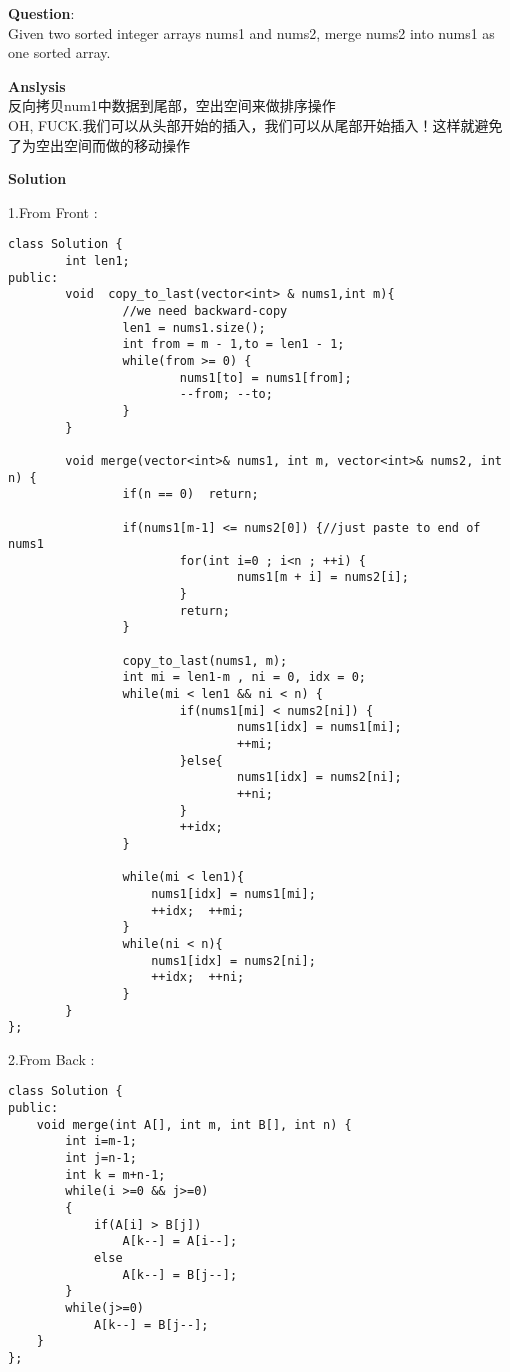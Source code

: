     
\begin{description}
    \item{\textbf{Question}}:\\%
		Given two sorted integer arrays nums1 and nums2, merge nums2 into nums1 as one sorted array.\\

    \item{\textbf{Anslysis}}\\
		反向拷贝num1中数据到尾部，空出空间来做排序操作\\
		OH, FUCK.我们可以从头部开始的插入，我们可以从尾部开始插入！这样就避免了为空出空间而做的移动操作\\

    \item{\textbf{Solution}}\\
	\item{1.From Front} : \\
		\begin{lstlisting}
class Solution {
		int len1;
public:
		void  copy_to_last(vector<int> & nums1,int m){
				//we need backward-copy
				len1 = nums1.size();
				int from = m - 1,to = len1 - 1;
				while(from >= 0) {
						nums1[to] = nums1[from];
						--from;	--to;
				}
		}

	    void merge(vector<int>& nums1, int m, vector<int>& nums2, int n) {
				if(n == 0)	return; 

				if(nums1[m-1] <= nums2[0]) {//just paste to end of nums1
						for(int i=0 ; i<n ; ++i) {
								nums1[m + i] = nums2[i];
						}
						return;
				}

				copy_to_last(nums1, m);
				int mi = len1-m , ni = 0, idx = 0;
				while(mi < len1 && ni < n) {
						if(nums1[mi] < nums2[ni]) {
								nums1[idx] = nums1[mi];
								++mi;
						}else{
								nums1[idx] = nums2[ni];
								++ni;
						}
						++idx;
				}

				while(mi < len1){
					nums1[idx] = nums1[mi];
					++idx;	++mi;
				}
				while(ni < n){
					nums1[idx] = nums2[ni];
					++idx;	++ni;
				}
		}
};
		\end{lstlisting}

	\item{2.From Back} : \\
		\begin{lstlisting}
class Solution {
public:
    void merge(int A[], int m, int B[], int n) {
        int i=m-1;
        int j=n-1;
        int k = m+n-1;
        while(i >=0 && j>=0)
        {
            if(A[i] > B[j])
                A[k--] = A[i--];
            else
                A[k--] = B[j--];
        }
        while(j>=0)
            A[k--] = B[j--];
    }
};
	\end{lstlisting}

\end{description}
